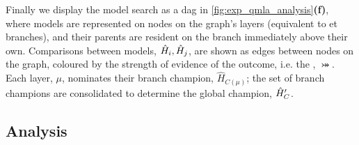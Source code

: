 Finally we display the model search as a \gls{dag} in \cref{fig:exp_qmla_analysis}\textbf{(f)}, 
    where models are represented on nodes on the graph's layers (equivalent to \gls{et} branches), 
    and their parents are resident on the branch immediately above their own.
Comparisons between models, $\hat{H}_i, \hat{H}_j$,  are shown as edges between nodes on the graph, 
    coloured by the strength of evidence of the outcome, i.e. the , $\bij$. 
Each layer, $\mu$, nominates their branch champion, $\hat{H}_{C(\mu)}$;
    the set of branch champions are consolidated to determine the global champion, $\hat{H}^{\prime}_C$. 
\subsection{Analysis}\label{sec:exp_qmla_analysis}


